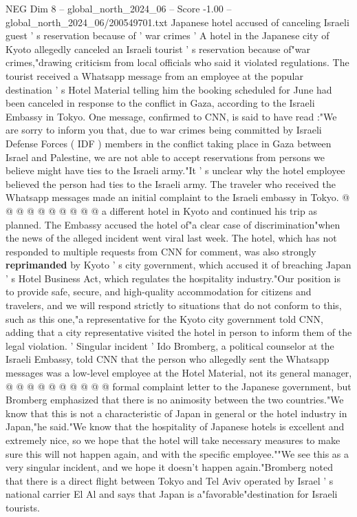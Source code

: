 \begin{textsample}{NEG Dim 8 – global\_north\_2024\_06 – Score -1.00 – global\_north\_2024\_06/200549701.txt}  \label{ex:f8_neg_194}
Japanese hotel accused of canceling Israeli guest ' s reservation because of ' war crimes ' A hotel in the Japanese city of Kyoto allegedly canceled an Israeli tourist ' s reservation because of"war crimes,"drawing criticism from local officials who said it violated regulations.
The tourist received a Whatsapp message from an employee at the popular destination ' s Hotel Material telling him the booking scheduled for June had been canceled in response to the conflict in Gaza, according to the Israeli Embassy in Tokyo.
One message, confirmed to CNN, is said to have read :"We are sorry to inform you that, due to war crimes being committed by Israeli Defense Forces ( IDF ) members in the conflict taking place in Gaza between Israel and Palestine, we are not able to accept reservations from persons we believe might have ties to the Israeli army."It ' s unclear why the hotel employee believed the person had ties to the Israeli army.
The traveler who received the Whatsapp messages made an initial complaint to the Israeli embassy in Tokyo. @ @ @ @ @ @ @ @ @ @ a different hotel in Kyoto and continued his trip as planned.
The Embassy accused the hotel of"a clear case of discrimination"when the news of the alleged incident went viral last week.
The hotel, which has not responded to multiple requests from CNN for comment, was also strongly \textbf{reprimanded} by Kyoto ' s city government, which accused it of breaching Japan ' s Hotel Business Act, which regulates the hospitality industry."Our position is to provide safe, secure, and high-quality accommodation for citizens and travelers, and we will respond strictly to situations that do not conform to this, such as this one,"a representative for the Kyoto city government told CNN, adding that a city representative visited the hotel in person to inform them of the legal violation. ' Singular incident ' Ido Bromberg, a political counselor at the Israeli Embassy, told CNN that the person who allegedly sent the Whatsapp messages was a low-level employee at the Hotel Material, not its general manager, @ @ @ @ @ @ @ @ @ @ formal complaint letter to the Japanese government, but Bromberg emphasized that there is no animosity between the two countries."We know that this is not a characteristic of Japan in general or the hotel industry in Japan,"he said."We know that the hospitality of Japanese hotels is excellent and extremely nice, so we hope that the hotel will take necessary measures to make sure this will not happen again, and with the specific employee.""We see this as a very singular incident, and we hope it doesn't happen again."Bromberg noted that there is a direct flight between Tokyo and Tel Aviv operated by Israel ' s national carrier El Al and says that Japan is a"favorable"destination for Israeli tourists.

\end{textsample}
